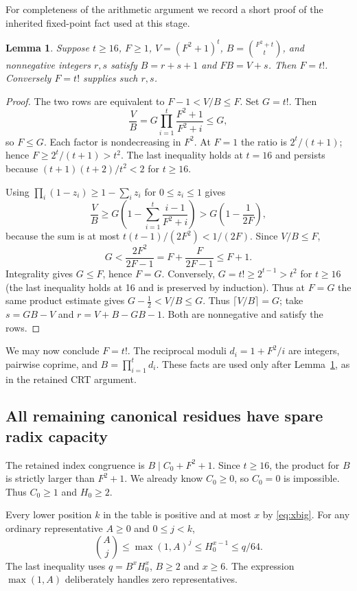 \documentclass[10pt,letterpaper]{article}
\newtheorem{lemma}[theorem]{Lemma}
\theoremstyle{definition}\newtheorem{definition}[theorem]{Definition}
\begin{document}
For completeness of the arithmetic argument we record a short proof of
the inherited fixed-point fact used at this stage.

\begin{lemma}\label{lem:factorial}
Suppose $t\ge16$, $F\ge1$, $V=(F^2+1)^t$,
$B=\binom{F^2+t}{t}$, and nonnegative integers $r,s$ satisfy
$B=r+s+1$ and $FB=V+s$. Then $F=t!$. Conversely $F=t!$ supplies such $r,s$.
\end{lemma}
\begin{proof}
The two rows are equivalent to $F-1<V/B\le F$. Set $G=t!$. Then
\[
 \frac VB=G\prod_{i=1}^t\frac{F^2+1}{F^2+i}\le G,
\]
so $F\le G$. Each factor is nondecreasing in $F^2$. At $F=1$ the ratio
is $2^t/(t+1)$; hence $F\ge2^t/(t+1)>t^2$. The last inequality holds
at $t=16$ and persists because
$(t+1)(t+2)/t^2<2$ for $t\ge16$.

Using $\prod_i(1-z_i)\ge1-\sum_i z_i$ for $0\le z_i\le1$ gives
\[
 \frac VB
 \ge G\left(1-\sum_{i=1}^t\frac{i-1}{F^2+i}\right)
 >G\left(1-\frac1{2F}\right),
\]
because the sum is at most $t(t-1)/(2F^2)<1/(2F)$.
Since $V/B\le F$,
\[
 G<\frac{2F^2}{2F-1}=F+\frac{F}{2F-1}\le F+1.
\]
Integrality gives $G\le F$, hence $F=G$.
Conversely, $G=t!\ge2^{t-1}>t^2$ for $t\ge16$ (the last inequality holds
at 16 and is preserved by induction). Thus at $F=G$ the same product estimate gives
$G-\tfrac12<V/B\le G$. Thus $\lceil V/B\rceil=G$; take
$s=GB-V$ and $r=V+B-GB-1$. Both are nonnegative and satisfy the rows.
\end{proof}

We may now conclude $F=t!$. The reciprocal moduli
$d_i=1+F^2/i$ are integers, pairwise coprime, and
$B=\prod_{i=1}^t d_i$. These facts are used only after
Lemma~\ref{lem:factorial}, as in the retained CRT argument.

\subsection{All remaining canonical residues have spare radix capacity}

The retained index congruence is $B\mid C_0+F^2+1$. Since $t\ge16$,
the product for $B$ is strictly larger than $F^2+1$. We already know
$C_0\ge0$, so $C_0=0$ is impossible. Thus $C_0\ge1$ and $H_0\ge2$.

Every lower position $k$ in the table is positive and at most $x$ by
\eqref{eq:xbig}. For any ordinary representative $A\ge0$ and $0\le j<k$,
\begin{equation}\label{eq:ordinarymargin}
 \binom Aj\le\max(1,A)^j\le H_0^{x-1}\le q/64.
\end{equation}
The last inequality uses $q=B^xH_0^x$, $B\ge2$ and $x\ge6$.
The expression $\max(1,A)$ deliberately handles zero representatives.
\end{document}

